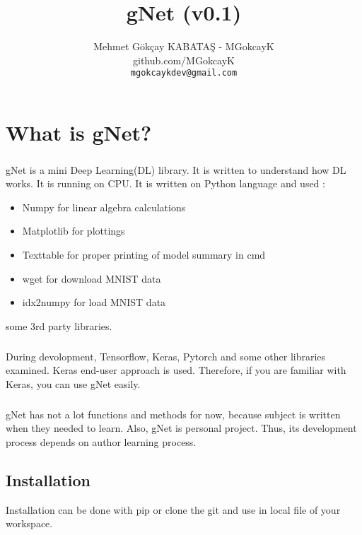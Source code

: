 \documentclass[12pt]{report}
\title {gNet (v0.1)}
\author{Mehmet Gökçay KABATAŞ - MGokcayK \\ github.com/MGokcayK \\ \texttt{mgokcaykdev@gmail.com}
}
\begin{document}
\maketitle
\tableofcontents





\chapter{What is gNet?}

\paragraph{}
gNet is a mini Deep Learning(DL) library. It is written to understand how DL works. It is running on CPU. It is written on Python language and used :

\begin{itemize}
	\item Numpy for linear algebra calculations
	\item Matplotlib for plottings
	\item Texttable for proper printing of model summary in cmd
	\item wget for download MNIST data
	\item idx2numpy for load MNIST data
\end{itemize}

some 3rd party libraries.

\paragraph{}
During devolopment, Tensorflow, Keras, Pytorch and some other libraries examined. Keras end-user approach is used. Therefore, if you are familiar with Keras, you can use gNet easily. 

\paragraph{}
gNet has not a lot functions and methods for now, because subject is written when they needed to learn. Also, gNet is personal project. Thus, its development process depends on author learning process.

\section{Installation}
Installation can be done with pip or clone the git and use in local file of your workspace.
\end{document}
